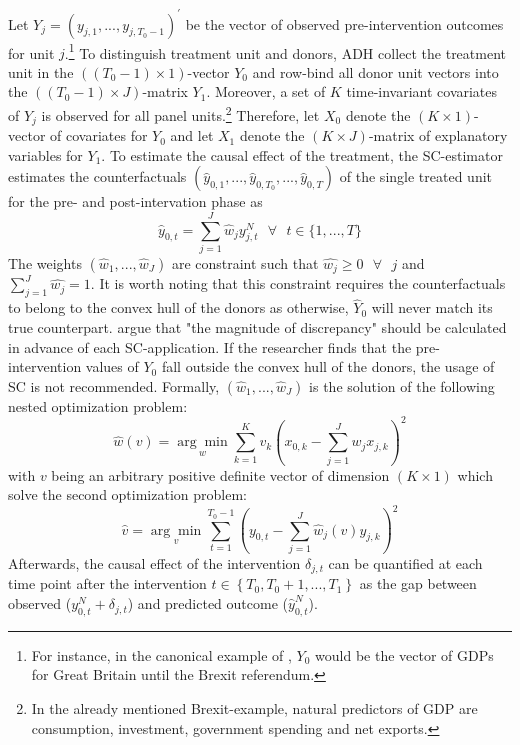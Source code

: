 Let $Y_j = (y_{j,1}, ..., y_{j,T_{0}-1})^\prime$ be the vector of observed pre-intervention outcomes for unit $j$.\footnote{For instance, in the canonical example of \cite{abadie:2003}, $Y_0$ would be the vector of \ac{GDP}s for Great Britain until the Brexit referendum.} To distinguish treatment unit and donors, \ac{ADH} collect the treatment unit in the $((T_{0}-1) \times 1) $-vector $Y_0$ and row-bind all donor unit vectors into the $((T_{0}-1) \times J)$-matrix $Y_1$. Moreover, a set of $K$ time-invariant covariates of $Y_j$ is observed for all panel units.\footnote{In the already mentioned Brexit-example, natural predictors of \ac{GDP} are consumption, investment, government spending and net exports.} Therefore, let $X_0$ denote the $(K \times 1)$-vector of covariates for $Y_0$ and let $X_1$ denote the $(K \times J)$-matrix of explanatory variables for $Y_1$. To estimate the causal effect of the treatment, the \ac{SC}-estimator estimates the counterfactuals $(\widehat{y}_{0,1}, ...,\widehat{y}_{0,T_0},..., \widehat{y}_{0,T})$ of the single treated unit for the pre- and post-intervation phase as 
\[
\widehat{y}_{0,t} = \sum_{j = 1}^{J} \widehat{w}_j y^{N}_{j,t} \text{ } \forall \text{ } t \in \{1,...,T\}
\]
The weights $(\widehat{w}_1, ... , \widehat{w}_J)$ are constraint such that $\widehat{w_j} \geq 0 \text{ } \forall \text{ } j$ and $\sum_{j = 1}^{J} \widehat{w_j} = 1$. It is worth noting that this constraint requires the counterfactuals to belong to the convex hull of the donors as otherwise, $\widehat{Y}_{0}$ will never match its true counterpart. \cite{abadie:2010} argue that "the magnitude of discrepancy" should be calculated in advance of each \ac{SC}-application. If the researcher finds that the pre-intervention values of ${Y}_{0}$ fall outside the convex hull of the donors, the usage of \ac{SC} is not recommended. Formally, $(\widehat{w}_1, ... , \widehat{w}_J)$ is the solution of the following nested optimization problem:
\[
\widehat{w}(v) = 
\underset{w}{\arg\min}
\sum_{k = 1}^{K} v_k \left(x_{0,k} - \sum_{j = 1}^{J} w_j x_{j,k} \right)^2 
\]
with $v$ being an arbitrary positive definite vector of dimension $(K \times 1)$ which solve the second optimization problem:
\[
\widehat{v} = 
\underset{v}{\arg\min}
\sum_{t = 1}^{T_0 - 1} \left(y_{0,t} - \sum_{j = 1}^{J}  \widehat{w}_j(v) y_{j,k} \right)^2
\]
Afterwards, the causal effect of the intervention $\delta_{j,t}$ can be quantified at each time point after the intervention $t \in \left\lbrace T_{0},T_{0}+1, ..., T_{1}\right\rbrace $ as the gap between observed ($y^{N}_{0,t} + \delta_{j,t}$) and predicted outcome ($\widehat{y}^{N}_{0,t}$).


